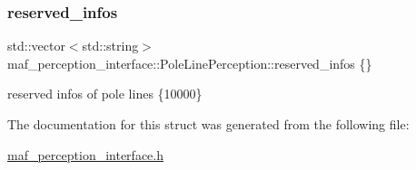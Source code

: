 \subsubsection{\texorpdfstring{reserved\+\_\+infos}{reserved\_infos}}
{\footnotesize\ttfamily std\+::vector$<$std\+::string$>$ maf\+\_\+perception\+\_\+interface\+::\+Pole\+Line\+Perception\+::reserved\+\_\+infos \{\}}



reserved infos of pole lines \{10000\} 



The documentation for this struct was generated from the following file\+:\begin{DoxyCompactItemize}
\item 
\hyperlink{maf__perception__interface_8h}{maf\+\_\+perception\+\_\+interface.\+h}\end{DoxyCompactItemize}
